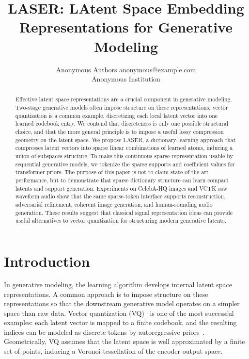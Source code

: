 \documentclass[10pt]{article}
\title{LASER: LAtent Space Embedding Representations for Generative Modeling}
\author{\name Anonymous Authors \email anonymous@example.com \\
      \addr Anonymous Institution}
\begin{document}
\maketitle

\begin{abstract}
Effective latent space representations are a crucial component in generative modeling. Two-stage generative models often impose structure on these representations; vector quantization is a common example, discretizing each local latent vector into one learned codebook entry. We contend that discreteness is only one possible structural choice, and that the more general principle is to impose a useful lossy compression geometry on the latent space. We propose LASER, a dictionary-learning approach that compresses latent vectors into sparse linear combinations of learned atoms, inducing a union-of-subspaces structure. To make this continuous sparse representation usable by sequential generative models, we tokenize the sparse supports and coefficient values for transformer priors. The purpose of this paper is not to claim state-of-the-art performance, but to demonstrate that sparse dictionary structure can learn compact latents and support generation. Experiments on CelebA-HQ images and VCTK raw waveform audio show that the same sparse-token interface supports reconstruction, adversarial refinement, coherent image generation, and human-sounding audio generation. These results suggest that classical signal representation ideas can provide useful alternatives to vector quantization for structuring modern generative latents.
\end{abstract}

\section{Introduction}

In generative modeling, the learning algorithm develops internal latent space representations. A common approach is to impose structure on these representations so that the downstream generative model operates on a simpler space than raw data. Vector quantization (VQ)~\citep{oord2017vqvae} is one of the most successful examples: each latent vector is mapped to a finite codebook, and the resulting indices can be modeled as discrete tokens by autoregressive priors~\citep{esser2021vqgan,vaswani2017attention}. Geometrically, VQ assumes that the latent space is well approximated by a finite set of points, inducing a Voronoi tessellation of the encoder output space.
\end{document}
